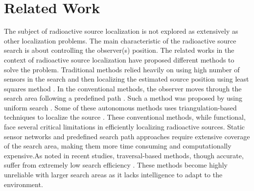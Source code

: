 \documentclass[../report.tex]{subfiles}
\begin{document}
    \section{Related Work}
    \label{sec:related_work}

    The subject of radioactive source localization is not explored as extensively as other localization problems. The main characteristic of the radioactive source search is about 
    controlling the observer(s) position. The related works in the context of radioactive source localization have proposed different methods to solve the problem. Traditional methods relied heavily on using high number of sensors in the search and then localizing the estimated source position using least squares method \cite{huang2001real} \cite{howse2001least}. 
    In the conventional methods, the observer moves through the search area following a predefined path \cite{ristic2010information}. Such a method was proposed by using uniform search \cite{ziock2002lost}.
    Some of these autonomous methods uses triangulation-based techniques to localize the source \cite{fragkos2020} \cite{liu2010simulation}. These conventional methods, while functional, 
    face several critical limitations in efficiently localizing radioactive sources. Static sensor networks and predefined search path approaches require extensive coverage of the search area, making them 
    more time consuming and computationally expensive.As noted in recent studies, traversal-based methods, though accurate, suffer from extremely low search efficiency \cite{hu2024autonomous}. These methods
    become highly unreliable with larger search areas as it lacks intelligence to adapt to the environment. 
    
\end{document}
